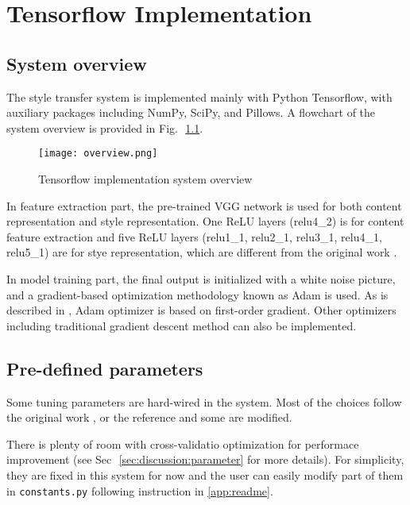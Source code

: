 
\chapter{Tensorflow Implementation}
\label{chap:implementation}


\section{System overview}
\label{sec:implementation:overview}

The style transfer system is implemented mainly with Python Tensorflow,
with auxiliary packages including NumPy, SciPy, and Pillows.
A flowchart of the system overview is provided in Fig.\,~\ref{fig:overview}.

    \begin{figure}[!hbt]
    \center
    \texttt{[image: overview.png]}
    \caption{Tensorflow implementation system overview}
    \label{fig:overview}
    \end{figure}

In feature extraction part, the pre-trained VGG network is used for both
content representation and style representation.
One ReLU layers (relu4\_2) is for content feature extraction
and five ReLU layers (relu1\_1, relu2\_1, relu3\_1, relu4\_1, relu5\_1) are for 
stye representation, which are different from the original work \cite{Gatys:2016gj}.

In model training part, the final output is initialized with a white noise picture,
and a gradient-based optimization methodology known as Adam is used.
As is described in \cite{kingma2014adam}, Adam optimizer is based on first-order gradient.
Other optimizers including traditional gradient descent method can also be implemented.


\section{Pre-defined parameters}
\label{sec:implementation:parameters}

Some tuning parameters are hard-wired in the system.
Most of the choices follow the original work \cite{Gatys:2016gj},
or the reference \cite{athalye2015neuralstyle} and some are modified.

There is plenty of room with cross-validatio optimization for performace improvement
(see Sec\,~\ref{sec:discussion:parameter} for more details).
For simplicity, they are fixed in this system for now and the user can easily modify part of them
in \texttt{constants.py} following instruction in \ref{app:readme}.

